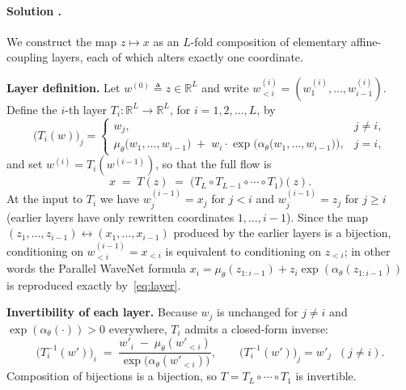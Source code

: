 \documentclass{article}
\newcounter{solutionCount}
\newcommand{\solution}[1]{
    \stepcounter{solutionCount}
    \paragraph{Solution \thesolutionCount.}
    {
        #1
    }
}
\begin{document}
\solution{
    We construct the map $z \mapsto x$ as an $L$-fold composition of elementary affine-coupling layers, each of which alters exactly one coordinate.

    \textbf{Layer definition.} Let $w^{(0)} \triangleq z \in \mathbb{R}^L$ and write $w^{(i)}_{<i} = (w^{(i)}_1, \ldots, w^{(i)}_{i-1})$. Define the $i$-th layer $T_i : \mathbb{R}^L \to \mathbb{R}^L$, for $i = 1, 2, \ldots, L$, by
    \begin{equation}
        \bigl(T_i(w)\bigr)_j = \begin{cases}
            w_j, & j \neq i, \\[2pt]
            \mu_\theta\bigl(w_1, \ldots, w_{i-1}\bigr) \;+\; w_i \cdot \exp\bigl(\alpha_\theta\bigl(w_1, \ldots, w_{i-1}\bigr)\bigr), & j = i,
        \end{cases}
        \label{eq:layer}
    \end{equation}
    and set $w^{(i)} = T_i(w^{(i-1)})$, so that the full flow is
    \begin{equation*}
        x \;=\; T(z) \;=\; \bigl(T_L \circ T_{L-1} \circ \cdots \circ T_1\bigr)(z).
    \end{equation*}
    At the input to $T_i$ we have $w^{(i-1)}_j = x_j$ for $j < i$ and $w^{(i-1)}_j = z_j$ for $j \geq i$ (earlier layers have only rewritten coordinates $1, \ldots, i-1$). Since the map $(z_1,\ldots,z_{i-1}) \leftrightarrow (x_1,\ldots,x_{i-1})$ produced by the earlier layers is a bijection, conditioning on $w^{(i-1)}_{<i} = x_{<i}$ is equivalent to conditioning on $z_{<i}$; in other words the Parallel WaveNet formula $x_i = \mu_\theta(z_{1:i-1}) + z_i \exp(\alpha_\theta(z_{1:i-1}))$ is reproduced exactly by~\eqref{eq:layer}.

    \textbf{Invertibility of each layer.} Because $w_j$ is unchanged for $j \neq i$ and $\exp(\alpha_\theta(\cdot)) > 0$ everywhere, $T_i$ admits a closed-form inverse:
    \begin{equation*}
        \bigl(T_i^{-1}(w')\bigr)_i \;=\; \frac{w'_i \;-\; \mu_\theta(w'_{<i})}{\exp\bigl(\alpha_\theta(w'_{<i})\bigr)}, \qquad \bigl(T_i^{-1}(w')\bigr)_j = w'_j \;\; (j \neq i).
    \end{equation*}
    Composition of bijections is a bijection, so $T = T_L \circ \cdots \circ T_1$ is invertible.

}
\end{document}
